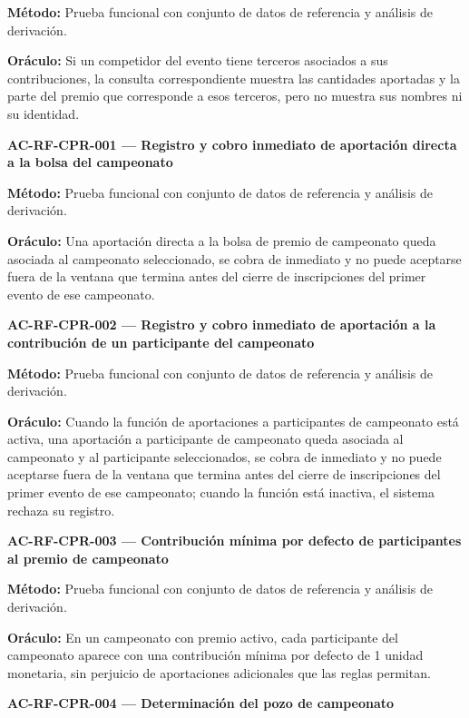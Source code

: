 \documentclass[10pt,letterpaper]{article}
\begin{document}
\textbf{Método:} Prueba funcional con conjunto de datos de referencia y análisis de derivación.\par
\textbf{Oráculo:} Si un competidor del evento tiene terceros asociados a sus contribuciones, la consulta correspondiente muestra las cantidades aportadas y la parte del premio que corresponde a esos terceros, pero no muestra sus nombres ni su identidad.\par\vspace{0.45em}
\noindent\textbf{AC-RF-CPR-001 --- Registro y cobro inmediato de aportación directa a la bolsa del campeonato}\par
\textbf{Método:} Prueba funcional con conjunto de datos de referencia y análisis de derivación.\par
\textbf{Oráculo:} Una aportación directa a la bolsa de premio de campeonato queda asociada al campeonato seleccionado, se cobra de inmediato y no puede aceptarse fuera de la ventana que termina antes del cierre de inscripciones del primer evento de ese campeonato.\par\vspace{0.45em}
\noindent\textbf{AC-RF-CPR-002 --- Registro y cobro inmediato de aportación a la contribución de un participante del campeonato}\par
\textbf{Método:} Prueba funcional con conjunto de datos de referencia y análisis de derivación.\par
\textbf{Oráculo:} Cuando la función de aportaciones a participantes de campeonato está activa, una aportación a participante de campeonato queda asociada al campeonato y al participante seleccionados, se cobra de inmediato y no puede aceptarse fuera de la ventana que termina antes del cierre de inscripciones del primer evento de ese campeonato; cuando la función está inactiva, el sistema rechaza su registro.\par\vspace{0.45em}
\noindent\textbf{AC-RF-CPR-003 --- Contribución mínima por defecto de participantes al premio de campeonato}\par
\textbf{Método:} Prueba funcional con conjunto de datos de referencia y análisis de derivación.\par
\textbf{Oráculo:} En un campeonato con premio activo, cada participante del campeonato aparece con una contribución mínima por defecto de 1 unidad monetaria, sin perjuicio de aportaciones adicionales que las reglas permitan.\par\vspace{0.45em}
\noindent\textbf{AC-RF-CPR-004 --- Determinación del pozo de campeonato}\par
\end{document}
